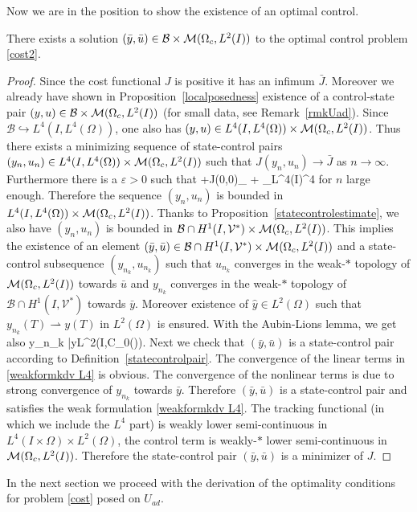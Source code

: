 Now we are in the position to show the existence of an optimal control.
\begin{proposition}
There exists a solution $(\bar y, \bar u)\in \mathcal B\times \mathcal{M}(\Omega_c, L^{2}(I)) $ to the optimal control problem \eqref{cost2}.
\end{proposition}
\begin{proof}
Since the cost functional $J$ is positive it has an infimum $\bar J$. Moreover we already have shown in Proposition~\ref{localposedness} existence of a control-state pair $(y,u)\in \mathcal{B}\times \mathcal{M}(\Omega_c, L^{2}(I))$ (for small data, see Remark~\ref{rmkUad}). Since $\mathcal{B} \hookrightarrow L^4(I,L^4(\Omega))$, one also has $(y,u)\in  L^4(I,L^4(\Omega))\times \mathcal{M}(\Omega_c, L^{2}(I))$. Thus there exists a minimizing sequence of state-control pairs $(y_n,u_n) \in L^4(I,L^4(\Omega))\times \mathcal{M}(\Omega_c, L^{2}(I))$ such that $J(y_n, u_n) \rightarrow \bar J$ as $n \rightarrow \infty$. Furthermore there is a $\varepsilon>0$ such that
\be
\varepsilon+J(0,0)\geq \alpha {}_{\M} +  _{L^4(I\times \Omega)}^4
\ee
for $n$ large enough. Therefore the sequence $(y_n,u_n)$ is bounded in $L^4(I,L^4(\Omega))\times \mathcal{M}(\Omega_c, L^{2}(I))$. Thanks to Proposition~\ref{statecontrolestimate}, we also have $(y_n,u_n)$ is bounded in $\mathcal{B}\cap H^{1}(I, \mathcal{V}^{*})\times \mathcal{M}(\Omega_c, L^{2}(I))$. This implies the existence of an element $(\bar y, \bar u)\in \mathcal{B}\cap H^{1}(I, \mathcal{V}^{*})\times \mathcal{M}(\Omega_c, L^{2}(I))$ and a state-control subsequence $(y_{n_k},u_{n_k})$  such that $u_{n_k}$ converges in the weak-$*$ topology of $\mathcal{M}(\Omega_c, L^{2}(I))$ towards $\bar u$ and $y_{n_k}$ converges in the weak-$\ast$ topology of $\mathcal{B}\cap H^{1}(I, \mathcal{V}^{*})$ towards $\bar y$. Moreover existence of $\hat y \in L^2(\Omega)$ such that $y_{n_k}(T) \rightharpoonup y(T)$ in $L^2(\Omega)$ is ensured. With the Aubin-Lions lemma, we get also
\be
\nonumber
y_{n_k} \rightarrow \bar y\quad{}\quad L^2(I,\mathcal C_0(\Omega)).
\ee
Next we check that $(\bar y, \bar u)$ is a state-control pair according to Definition~\ref{statecontrolpair}. The convergence of the linear terms in \eqref{weakformkdv L4} is obvious. The convergence of the nonlinear terms is due to strong convergence of $y_{n_k}$ towards $\bar y$. %
Therefore $(\bar y, \bar u)$ is a state-control pair and satisfies the weak formulation \eqref{weakformkdv L4}. The tracking functional (in which we include the $L^4$ part) is weakly lower semi-continuous in $L^4(I\times \Omega)\times L^2(\Omega)$, the control term is weakly-$*$ lower semi-continuous in $\mathcal{M}(\Omega_c, L^{2}(I))$. Therefore the state-control pair $(\bar y, \bar u)$ is a minimizer of $J$.
\qquad\end{proof}

In the next section we proceed with the derivation of the optimality conditions for problem \eqref{cost} posed on $U_{ad}$.


